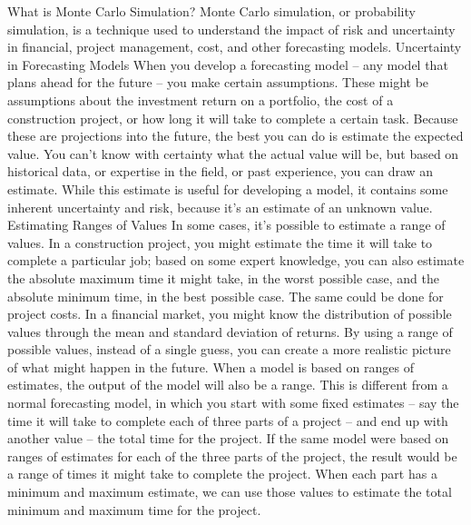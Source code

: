 What is Monte Carlo Simulation?
Monte Carlo simulation, or probability simulation, is a technique used to understand the impact of risk
and uncertainty in financial, project management, cost, and other forecasting models.
Uncertainty in Forecasting Models
When you develop a forecasting model – any model that plans ahead for the future – you make certain
assumptions. These might be assumptions about the investment return on a portfolio, the cost of a
construction project, or how long it will take to complete a certain task. Because these are projections
into the future, the best you can do is estimate the expected value.
You can't know with certainty what the actual value will be, but based on historical data, or expertise in
the field, or past experience, you can draw an estimate. While this estimate is useful for developing a
model, it contains some inherent uncertainty and risk, because it's an estimate of an unknown value.
Estimating Ranges of Values
In some cases, it's possible to estimate a range of values. In a construction project, you might estimate
the time it will take to complete a particular job; based on some expert knowledge, you can also
estimate the absolute maximum time it might take, in the worst possible case, and the absolute
minimum time, in the best possible case. The same could be done for project costs. In a financial
market, you might know the distribution of possible values through the mean and standard deviation of
returns.
By using a range of possible values, instead of a single guess, you can create a more realistic picture of
what might happen in the future. When a model is based on ranges of estimates, the output of the
model will also be a range. 
This is different from a normal forecasting model, in which you start with some fixed estimates – say
the time it will take to complete each of three parts of a project – and end up with another value – the
total time for the project. If the same model were based on ranges of estimates for each of the three
parts of the project, the result would be a range of times it might take to complete the project. When
each part has a minimum and maximum estimate, we can use those values to estimate the total
minimum and maximum time for the project.
